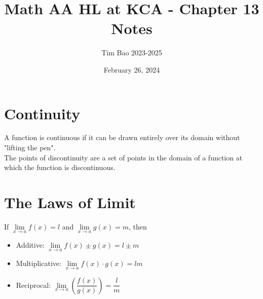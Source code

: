 \documentclass[11pt]{article}
\title{Math AA HL at KCA - Chapter 13 Notes}
\author{Tim Bao 2023-2025}
\date{February 26, 2024}
\newcommand{\lb}{\\[8pt]}
\begin{document}
\maketitle
\pagebreak
\tableofcontents
\pagebreak

\section{Continuity}

A function is continuous if it can be drawn entirely over its domain without "lifting the pen".\lb
The points of discontinuity are a set of points in the domain of a function at which the function is discontinuous.

\pagebreak

\section{The Laws of Limit}

If $\lim\limits_{x\to a}{f(x)} = l$ and $\lim\limits_{x\to a}{g(x)} = m$, then
\begin{itemize}
  \item Additive: $\lim\limits_{x\to a}{f(x) \pm g(x)} = l\pm m$
  \item Multiplicative: $\lim\limits_{x\to a}{f(x) \cdot g(x)} = lm$
  \item Reciprocal: $\lim\limits_{x\to a}\left(\dfrac{f(x)}{g(x)}\right) = \dfrac{l}{m}$
\end{itemize}
\end{document}
